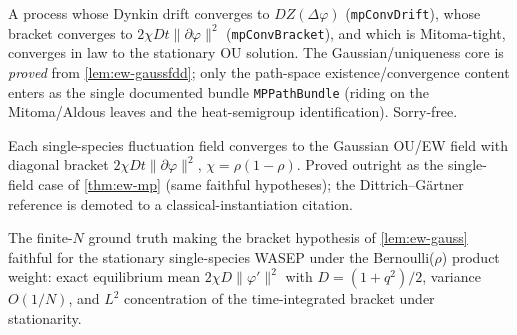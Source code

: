 \begin{theorem}\label{thm:ew-mp}
  \leanok
  A process whose Dynkin drift converges to $DZ(\Delta\varphi)$
  (\texttt{mpConvDrift}), whose bracket converges to $2\chi Dt\|\partial\varphi\|^2$
  (\texttt{mpConvBracket}), and which is Mitoma-tight, converges in law to the
  stationary OU solution.  The Gaussian/uniqueness core is \emph{proved} from
  \ref{lem:ew-gaussfdd}; only the path-space existence/convergence content enters as
  the single documented bundle \texttt{MPPathBundle} (riding on the Mitoma/Aldous
  leaves and the heat-semigroup identification).  Sorry-free.
\end{theorem}

\begin{lemma}\label{lem:ew-gauss}
  \leanok
  Each single-species fluctuation field converges to the Gaussian OU/EW field with
  diagonal bracket $2\chi Dt\|\partial\varphi\|^2$, $\chi = \rho(1-\rho)$.  Proved
  outright as the single-field case of \ref{thm:ew-mp} (same faithful hypotheses);
  the Dittrich--G\"artner reference is demoted to a classical-instantiation citation.
\end{lemma}

\begin{lemma}\label{lem:ew-bracketn}
  \leanok
  The finite-$N$ ground truth making the bracket hypothesis of \ref{lem:ew-gauss}
  faithful for the stationary single-species WASEP under the Bernoulli($\rho$)
  product weight: exact equilibrium mean $2\chi D\|\varphi'\|^2$ with
  $D = (1+q^2)/2$, variance $O(1/N)$, and $L^2$ concentration of the time-integrated
  bracket under stationarity.
\end{lemma}

